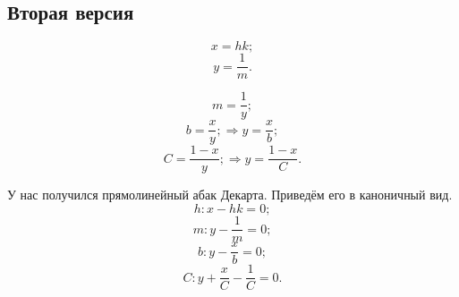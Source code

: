 \subsection{Вторая версия}

$$x = hk;$$
$$y = \frac{1}{m}.$$

$$m = \frac{1}{y};$$
$$b = \frac{x}{y}; \Rightarrow y = \frac{x}{b};$$
$$C = \frac{1 - x}{y}; \Rightarrow y = \frac{1 - x}{C}.$$

У нас получился прямолинейный абак Декарта.
Приведём его в каноничный вид.
$$h: x - hk = 0;$$
$$m: y - \frac{1}{m} = 0;$$
$$b: y - \frac{x}{b} = 0;$$
$$C: y + \frac{x}{C} - \frac{1}{C} =0.$$